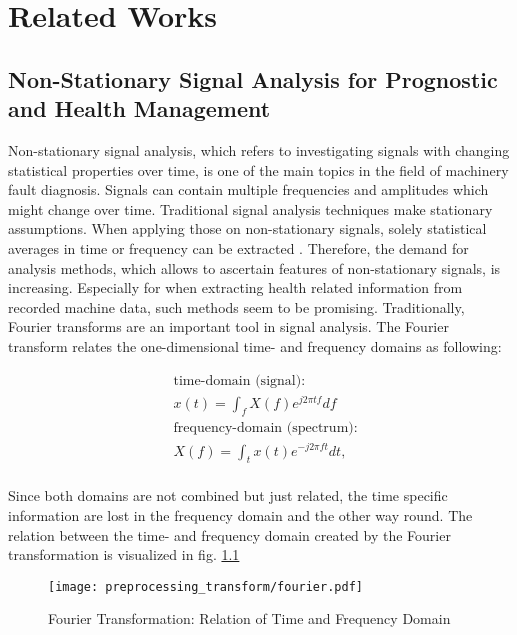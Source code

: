 
\chapter{Related Works}\label{chapter:related_works}
\begin{comment}
In general, the methods applied can be categorized into physics-based, statistics-based, artificial intelligence (AI) and hybrid approaches.

\end{comment}


\section{Non-Stationary Signal Analysis for Prognostic and Health Management}
Non-stationary signal analysis, which refers to investigating signals with changing statistical properties over time, is one of the main topics in the field of machinery fault diagnosis. Signals can contain multiple frequencies and amplitudes which might change over time. Traditional signal analysis techniques make stationary assumptions. When applying those on non-stationary signals, solely statistical averages in time or frequency can be extracted \cite{FENG2013}. Therefore, the demand for analysis methods, which allows to ascertain features of non-stationary signals, is increasing. Especially for when extracting health related information from recorded machine data, such methods seem to be promising. Traditionally, Fourier transforms are an important tool in signal analysis. The Fourier transform relates the one-dimensional time- and frequency domains as following:

\begin{equation}
    \begin{aligned}
        & \mbox{time-domain (signal):} \\
        & x(t) = \int_{f} X(f) e^{j 2 \pi t f} df \\
        & \mbox{frequency-domain (spectrum):} \\
        & X(f) = \int_{t} x(t) e^{- j 2 \pi f t} dt, \\
    \end{aligned}
\end{equation}

Since both domains are not combined but just related, the time specific information are lost in the frequency domain and the other way round. The relation between the time- and frequency domain created by the Fourier transformation is visualized in fig. \ref{fig:fourier} 
\begin{figure}[H]
  \centering
  \texttt{[image: preprocessing\_transform/fourier.pdf]}
  \caption{Fourier Transformation: Relation of Time and Frequency Domain}
  \label{fig:fourier}
\end{figure}

